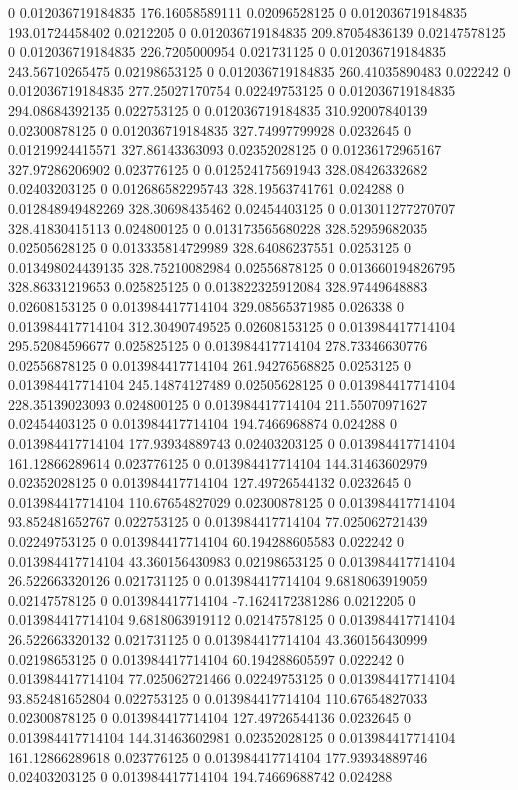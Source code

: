 0 0.012036719184835 176.16058589111 0.02096528125
0 0.012036719184835 193.01724458402 0.0212205
0 0.012036719184835 209.87054836139 0.02147578125
0 0.012036719184835 226.7205000954 0.021731125
0 0.012036719184835 243.56710265475 0.02198653125
0 0.012036719184835 260.41035890483 0.022242
0 0.012036719184835 277.25027170754 0.02249753125
0 0.012036719184835 294.08684392135 0.022753125
0 0.012036719184835 310.92007840139 0.02300878125
0 0.012036719184835 327.74997799928 0.0232645
0 0.01219924415571 327.86143363093 0.02352028125
0 0.01236172965167 327.97286206902 0.023776125
0 0.012524175691943 328.08426332682 0.02403203125
0 0.012686582295743 328.19563741761 0.024288
0 0.012848949482269 328.30698435462 0.02454403125
0 0.013011277270707 328.41830415113 0.024800125
0 0.013173565680228 328.52959682035 0.02505628125
0 0.013335814729989 328.64086237551 0.0253125
0 0.013498024439135 328.75210082984 0.02556878125
0 0.013660194826795 328.86331219653 0.025825125
0 0.013822325912084 328.97449648883 0.02608153125
0 0.013984417714104 329.08565371985 0.026338
0 0.013984417714104 312.30490749525 0.02608153125
0 0.013984417714104 295.52084596677 0.025825125
0 0.013984417714104 278.73346630776 0.02556878125
0 0.013984417714104 261.94276568825 0.0253125
0 0.013984417714104 245.14874127489 0.02505628125
0 0.013984417714104 228.35139023093 0.024800125
0 0.013984417714104 211.55070971627 0.02454403125
0 0.013984417714104 194.7466968874 0.024288
0 0.013984417714104 177.93934889743 0.02403203125
0 0.013984417714104 161.12866289614 0.023776125
0 0.013984417714104 144.31463602979 0.02352028125
0 0.013984417714104 127.49726544132 0.0232645
0 0.013984417714104 110.67654827029 0.02300878125
0 0.013984417714104 93.852481652767 0.022753125
0 0.013984417714104 77.025062721439 0.02249753125
0 0.013984417714104 60.194288605583 0.022242
0 0.013984417714104 43.360156430983 0.02198653125
0 0.013984417714104 26.522663320126 0.021731125
0 0.013984417714104 9.6818063919059 0.02147578125
0 0.013984417714104 -7.1624172381286 0.0212205
0 0.013984417714104 9.6818063919112 0.02147578125
0 0.013984417714104 26.522663320132 0.021731125
0 0.013984417714104 43.360156430999 0.02198653125
0 0.013984417714104 60.194288605597 0.022242
0 0.013984417714104 77.025062721466 0.02249753125
0 0.013984417714104 93.852481652804 0.022753125
0 0.013984417714104 110.67654827033 0.02300878125
0 0.013984417714104 127.49726544136 0.0232645
0 0.013984417714104 144.31463602981 0.02352028125
0 0.013984417714104 161.12866289618 0.023776125
0 0.013984417714104 177.93934889746 0.02403203125
0 0.013984417714104 194.74669688742 0.024288
